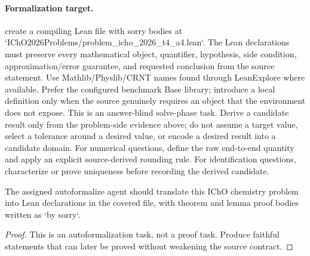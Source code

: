 \paragraph{Formalization target.}
create a compiling Lean file with sorry bodies at `IChO2026Problems/problem\_icho\_2026\_t4\_a4.lean`.
The Lean declarations must preserve every mathematical object, quantifier, hypothesis, side condition, approximation/error guarantee, and requested conclusion from the source statement.
Use Mathlib/Physlib/CRNT names found through LeanExplore where available. Prefer the configured benchmark Base library; introduce a local definition only when the source genuinely requires an object that the environment does not expose.
This is an answer-blind solve-phase task. Derive a candidate result only from the problem-side evidence above; do not assume a target value, select a tolerance around a desired value, or encode a desired result into a candidate domain.
For numerical questions, define the raw end-to-end quantity and apply an explicit source-derived rounding rule. For identification questions, characterize or prove uniqueness before recording the derived candidate.

\begin{theorem}
\label{thm:physics:icho_2026_t4_a4:target}
The assigned autoformalize agent should translate this IChO chemistry problem into Lean declarations in the covered file, with theorem and lemma proof bodies written as `by sorry`.
\end{theorem}
\begin{proof}
This is an autoformalization task, not a proof task. Produce faithful statements that can later be proved without weakening the source contract.
\end{proof}

